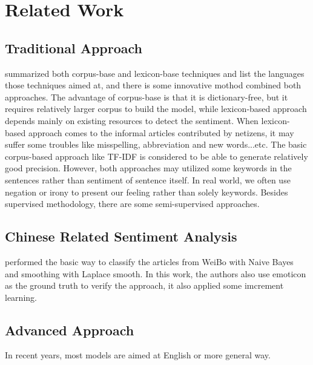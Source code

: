 \chapter{Related Work}


\section{Traditional Approach}

\cite{Dashtipour2016} summarized both corpus-base and lexicon-base techniques and list the languages those techniques aimed at, and there is some innovative mothod combined both approaches. 
The advantage of corpus-base is that it is dictionary-free, but it requires relatively larger corpus to build the model, while lexicon-based approach depends mainly on existing resources to detect the sentiment.
When lexicon-based approach comes to the informal articles contributed by netizens, it may suffer some troubles like misspelling, abbreviation and new words...etc.   
The basic corpus-based approach like TF-IDF is considered to be able to generate relatively good precision.
However, both approaches may utilized some keywords in the sentences rather than sentiment of sentence itself. In real world, we often use negation or irony to present our feeling rather than solely keywords. 
Besides supervised methodology, there are some semi-supervised approaches.

\section{Chinese Related Sentiment Analysis}

\cite{zhao2012moodlens} performed the basic way to classify the articles from WeiBo with Naive Bayes and smoothing with Laplace smooth.  
In this work, the authors also use emoticon as the ground truth to verify the approach, it also applied some imcrement learning. \\


\section{Advanced Approach}

In recent years, most models are aimed at English or more general way. 


